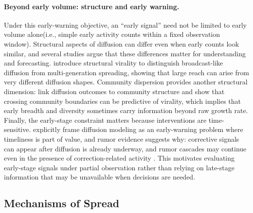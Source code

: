 \paragraph{Beyond early volume: structure and early warning.}
Under this early-warning objective, an ``early signal'' need not be limited to early volume alone(i.e., simple early activity counts within a fixed observation window). Structural aspects of diffusion can differ even when early counts look similar, and several studies argue that these differences matter for understanding and forecasting. \citet{goel_structural_2016} introduce structural virality to distinguish broadcast-like diffusion from multi-generation spreading, showing that large reach can arise from very different diffusion shapes. Community dispersion provides another structural dimension: \citet{weng_virality_2013} link diffusion outcomes to community structure and show that crossing community boundaries can be predictive of virality, which implies that early breadth and diversity sometimes carry information beyond raw growth rate. Finally, the early-stage constraint matters because interventions are time-sensitive. \citet{colbaugh_earlywarning_2012} explicitly frame diffusion modeling as an early-warning problem where timeliness is part of value, and rumor evidence suggests why: corrective signals can appear after diffusion is already underway, and rumor cascades may continue even in the presence of correction-related activity \citep{friggeri_rumor_2014}. This motivates evaluating early-stage signals under partial observation rather than relying on late-stage information that may be unavailable when decisions are needed.


\subsection{Mechanisms of Spread}

